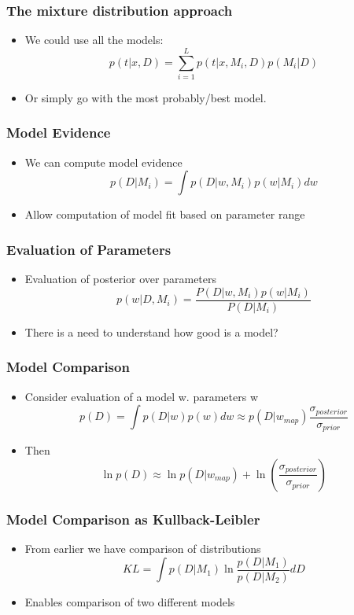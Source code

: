 \documentclass[10pt]{beamer}
\begin{document}
\begin{frame}
  \frametitle{The mixture distribution approach}
  \begin{itemize}
  \item We could use all the models:
    \[
    p(t|x,D) = \sum_{i=1}^L p(t|x,M_i,D) p(M_i|D)
    \]
  \item Or simply go with the most probably/best model. 
  \end{itemize}
\end{frame}

\begin{frame}
  \frametitle{Model Evidence}
  \begin{itemize}
  \item We can compute model evidence
    \[
    p(D|M_i) = \int p(D|w, M_i) p(w|M_i) dw
    \]
  \item Allow computation of model fit based on parameter range 
  \end{itemize}
\end{frame}

\begin{frame}
  \frametitle{Evaluation of Parameters}
  \begin{itemize}
  \item Evaluation of posterior over parameters
    \[ p(w | D, M_i) = \frac{ P(D | w, M_i) p(w | M_i)}{P(D|M_i)} \]
  \item There is a need to understand how good is a model?
  \end{itemize}
\end{frame}

\begin{frame}
  \frametitle{Model Comparison}
  \begin{itemize}
  \item Consider evaluation of a model w. parameters w
    \[ 
    p(D) = \int p(D|w) p(w) dw \approx p(D|w_{map})
    \frac{\sigma_{posterior}}{\sigma_{prior}}
    \]
  \item Then
    \[
    \ln p(D) \approx \ln p(D|w_{map}) + \ln
    \left( \frac{\sigma_{posterior}}{\sigma_{prior}} \right)
    \]
  \end{itemize}
\end{frame}

\begin{frame}
  \frametitle{Model Comparison as Kullback-Leibler}
  \begin{itemize}
  \item From earlier we have comparison of distributions
    \[
    KL = \int p(D|M_1) \ln \frac{p(D|M_1)}{p(D|M_2)} d D
    \]
  \item Enables comparison of two different models
  \end{itemize}
\end{frame}
\end{document}
